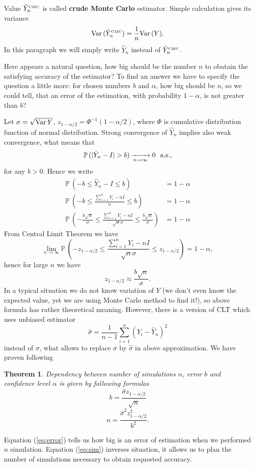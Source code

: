 \documentclass[a4paper,12pt, oneside]{book}
\newtheorem{thm}{Theorem}[section]
\theoremstyle{definition}
\theoremstyle{remark}
\def\Var{{\rm Var}\,}
\def\P{{\mathbb{P}}\,}
\def\conv{\xrightarrow[n \rightarrow \infty]{}}
\def\limn{\lim\limits_{n \rightarrow \infty} }
\def\CMC[#1]{\hat{Y}^{\hbox{\tiny CMC}}_{#1}}
\begin{document}
Value $\CMC[n]$ is called \textbf{crude Monte Carlo} estimator. Simple calculation gives its variance
\begin{equation}
 \label{eq:VarCMC}
 \Var(\CMC[n]) = \frac{1}{n}\Var(Y).
\end{equation}
In this paragraph we will simply write $\hat{Y}_n$ instead of $\CMC[n]$.

Here appears a natural question, how big should be the number $n$ to obatain the satisfying accuracy of the estimator? To find an answer we have to specify the question a little more: for chosen numbers $b$ and $\alpha$, how big should be $n$, so we could tell, that an error of the estimation, with probability $1-\alpha$, is not greater than $b$?

Let $\sigma = \sqrt{\Var{Y}}$, $z_{1-\alpha/2} = \Phi^{-1}(1-\alpha/2)$, where $\Phi$ is cumulative distribution function of normal distribution. Strong convergence of $\hat{Y}_n$ implies also weak convergence, what means that
\[ \P(|\hat{Y}_n - I| > b) \conv 0 \hbox{\ \ a.s.,} \]
for any $b > 0$. 
Hence we write
\begin{align*}
 \P(-b \leq \hat{Y}_n - I \leq b) &= 1 - \alpha\\
 \P(-b \leq \frac{\sum\limits_{i=1}^n Y_i - nI}{n}  \leq b) &= 1 - \alpha\\
 \P(-\frac{b\sqrt{n}}{\sigma} \leq \frac{\sum\limits_{i=1}^n Y_i - nI}{\sqrt{n}\sigma}  \leq \frac{b\sqrt{n}}{\sigma}) &= 1 - \alpha
\end{align*}
From Central Limit Theorem we have
\[ \limn \P(-z_{1-\alpha/2} \leq \frac{\sum\limits_{i=1}^n Y_i - nI}{\sqrt{n}\sigma}  \leq z_{1-\alpha/2}) = 1 - \alpha, \]
hence for large $n$ we have
\[z_{1-\alpha/2} \approx \frac{b\sqrt{n}}{\sigma}.\]
In a typical situation we do not know variation of $Y$ (we don't even know the expected value, yet we are using Monte Carlo method to find it!), so above formula has rather theoretical meaning. However, there is a version of CLT which uses unbiased estimator
\[ \hat{\sigma} = \frac{1}{n-1}\sum\limits_{i=1}^n (Y_i - \hat{Y}_n)^2 \]
instead of $\sigma$, what allows to replace $\sigma$ by $\hat{\sigma}$ in above approximation. We have proven following 
\begin{thm}
 Dependency between number of simulations $n$, error $b$ and confidence level $\alpha$ is given by following formulas
 \begin{equation}
   \label{eq:error}
   b = \frac{\hat{\sigma} z_{1-\alpha/2}}{\sqrt{n}}
 \end{equation}
 \begin{equation}
   \label{eq:sim}
   n = \frac{\hat{\sigma}^2 z_{1-\alpha/2}^2}{b^2}.
 \end{equation}
\end{thm}
\noindent Equation (\ref{eq:error}) tells us how big is an error of estimation when we performed $n$ simulation. Equation (\ref{eq:sim}) inverses situation, it allows us to plan the number of simulations necessary to obtain requested accuracy.
\end{document}
